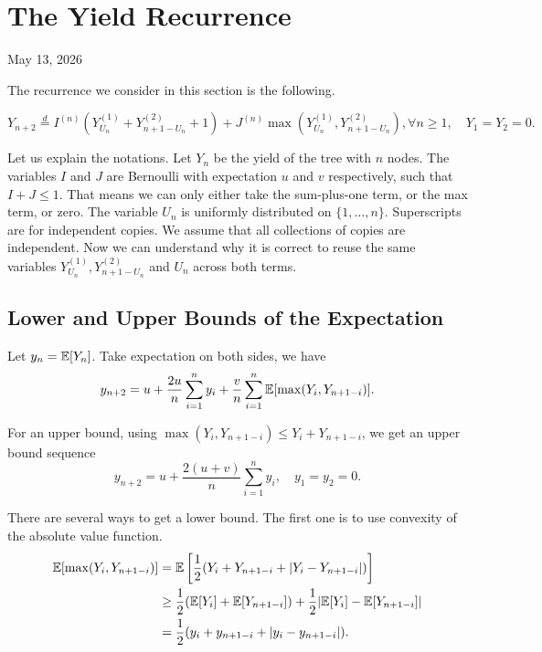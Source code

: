 \chapter{The Yield Recurrence}

\begin{center}
  May 13, 2026
  \vspace{0.5cm}
\end{center}

The recurrence we consider in this section is the following.

\begin{equation}
  \label{eq:yield_indicator}
  Y_{n+2} \stackrel{d}{=} I^{(n)}\left(Y_{U_n}^{(1)} + Y_{n+1-U_n}^{(2)} + 1\right) + J^{(n)}\max\left(Y_{U_n}^{(1)}, Y_{n+1-U_n}^{(2)}\right), \forall n\ge 1, \quad Y_1=Y_2=0.
\end{equation}

Let us explain the notations. Let $Y_n$ be the yield of the tree with $n$ nodes. The variables $I$ and $J$ are Bernoulli with expectation $u$ and $v$ respectively, such that $I + J \le 1$. That means we can only either take the sum-plus-one term, or the max term, or zero. The variable $U_n$ is uniformly distributed on $\{1, \ldots, n\}$. Superscripts are for independent copies. We assume that all collections of copies are independent. Now we can understand why it is correct to reuse the same variables $Y_{U_n}^{(1)}, Y_{n+1-U_n}^{(2)}$ and $U_n$ across both terms.


\section{Lower and Upper Bounds of the Expectation}

Let $y_n=\mathbb{E}[Y_n]$. Take expectation on both sides, we have
$$y_{n+2} = u + \dfrac{2u}{n}\sum_{i=1}^{n}y_i + \dfrac{v}{n}\sum_{i=1}^{n}\mathbb{E}[\max(Y_i, Y_{n+1-i})].$$

For an upper bound, using $\max(Y_i, Y_{n+1-i}) \le Y_i + Y_{n+1-i}$, we get an upper bound sequence
\begin{equation}
  \label{eq:upper_bound}
  y_{n+2} = u + \dfrac{2(u+v)}{n}\sum_{i=1}^{n}y_i, \quad y_1=y_2=0.
\end{equation}

There are several ways to get a lower bound. The first one is to use convexity of the absolute value function.
\begin{align*}
  \mathbb{E}[\max(Y_i, Y_{n+1-i})]
   & = \mathbb{E}\left[\dfrac{1}{2}(Y_i + Y_{n+1-i} + |Y_i - Y_{n+1-i}|)\right]                   \\
   & \ge \dfrac{1}{2}(\mathbb{E}[Y_i] + \mathbb{E}[Y_{n+1-i}]) + \dfrac{1}{2}|\mathbb{E}[Y_i] - \mathbb{E}[Y_{n+1-i}]| \\
   & = \dfrac{1}{2}(y_i + y_{n+1-i} + |y_i - y_{n+1-i}|).
\end{align*}

